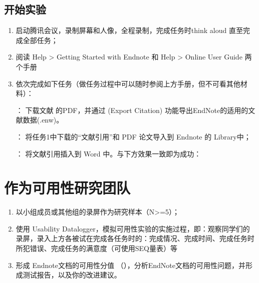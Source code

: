 \documentclass[letterpaper,10pt,english]{sphinxmanual}
\begin{document}
\subsection{开始实验}
\label{\detokenize{capstone-project/endnote-doc-usability:id5}}\begin{enumerate}
%
\item {} 
\sphinxAtStartPar
启动腾讯会议，录制屏幕和人像，全程录制，完成任务时think aloud 直至完成全部任务；

\item {} 
\sphinxAtStartPar
阅读 Help > Getting Started with Endnote 和 Help > Online User Guide 两个手册

\item {} 
\sphinxAtStartPar
依次完成如下任务（做任务过程中可以随时参阅上方手册，但不可看其他材料）：

\sphinxAtStartPar
{}： 	下载文献  的PDF，并通过  (Export Citation) 功能导出EndNote的适用的文献数据(.enw)。

\sphinxAtStartPar
{}

\sphinxAtStartPar
{}：  将任务1中下载的“文献引用”和 PDF 论文导入到 Endnote 的 Library中；

\sphinxAtStartPar
{}：  将文献引用插入到 Word 中。与下方效果一致即为成功：

\sphinxAtStartPar
{}

\end{enumerate}


\section{作为可用性研究团队}
\label{\detokenize{capstone-project/endnote-doc-usability:id6}}\begin{enumerate}
%
\item {} 
\sphinxAtStartPar
以小组成员或其他组的录屏作为研究样本（N>=5）；

\item {} 
\sphinxAtStartPar
使用 Usability Datalogger，模拟可用性实验的实施过程，即：观察同学们的录屏，录入上方各被试在完成各任务时的：完成情况、完成时间、完成任务时所犯错误、完成任务的满意度（可使用SEQ量表）等

\item {} 
\sphinxAtStartPar
形成 Endnote文档的可用性分值 （），分析EndNote文档的可用性问题，并形成测试报告，以及你的改进建议。

\end{enumerate}
\end{document}
